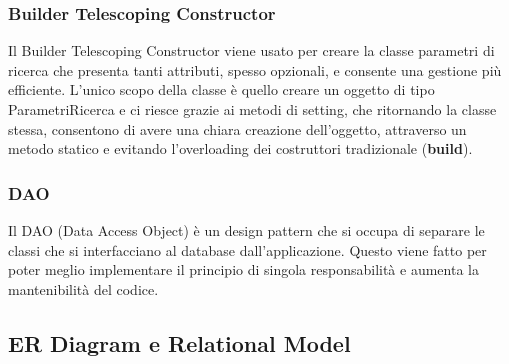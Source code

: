 \documentclass[10pt]{article}
\begin{document}
\subsubsection{Builder Telescoping Constructor}

Il Builder Telescoping Constructor viene usato per creare la classe parametri di ricerca che presenta tanti attributi, spesso opzionali, e consente una gestione più efficiente. L'unico scopo della classe è quello creare un oggetto di tipo ParametriRicerca e ci riesce grazie ai metodi di setting, che ritornando la classe stessa, consentono di avere una chiara creazione dell'oggetto, attraverso un metodo statico e evitando l'overloading dei costruttori tradizionale (\textbf{build}).

\subsubsection{DAO}

Il DAO (Data Access Object) è un design pattern che si occupa di separare le classi che si interfacciano al database dall'applicazione. Questo viene fatto
per poter meglio implementare il principio di singola responsabilità e aumenta
la mantenibilità del codice.

\subsection{ER Diagram e Relational Model}
\end{document}
